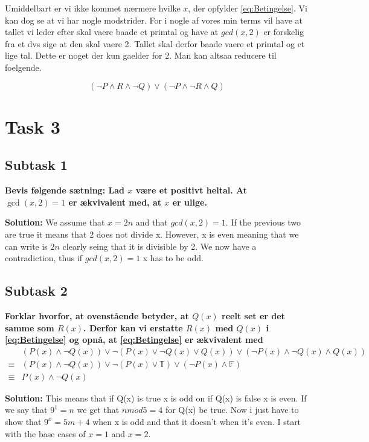 Umiddelbart er vi ikke kommet nærmere hvilke $x$, der opfylder \eqref{eq:Betingelse}. Vi kan dog se at vi har nogle modstrider. For i nogle af vores min terms vil have at tallet vi leder efter skal vaere baade et primtal og have at $gcd(x,2)$ er forskelig fra et dvs sige at den skal vaere 2. Tallet skal derfor baade vaere et primtal og et lige tal. Dette er noget der kun gaelder for 2. Man kan altsaa reducere til foelgende. 

\begin{equation}
    (\neg P \wedge R \wedge \neg Q)\vee(\neg P \wedge \neg R \wedge Q)
\end{equation}


\section{Task 3}
\subsection{Subtask 1}
\noindent
\textbf{Bevis følgende sætning: Lad $x$ være et positivt heltal. At $\gcd(x,2)=1$ er ækvivalent med, at $x$ er ulige.}

\bigskip
\noindent
\textbf{Solution:} We assume that $x=2n$ and that $gcd(x,2)=1$. If the previous two are true it means that 2 does not divide x. However, x is even meaning that we can write is $2n$ clearly seing that it is divisible by 2. We now have a contradiction, thus if $gcd(x,2)=1$ x has to be odd.

\subsection{Subtask 2}
\noindent
\textbf{Forklar hvorfor, at ovenstående betyder, at $Q(x)$ reelt set er det samme som $R(x)$. Derfor kan vi erstatte $R(x)$ med $Q(x)$ i \eqref{eq:Betingelse} og opnå, at \eqref{eq:Betingelse} er ækvivalent med
	\begin{align}\label{eq:BetingelseReduceret}
		&(P(x)\wedge \neg Q(x)) \vee \neg(P(x)\vee \neg Q(x) \vee Q(x)) \vee (\neg P(x) \wedge \neg Q(x) \wedge Q(x)) \nonumber\\ 
		\equiv& (P(x)\wedge \neg Q(x)) \vee \neg(P(x)\vee \mathbb{T}) \vee (\neg P(x) \wedge \mathbb{F}) \nonumber\\
		\equiv& P(x)\wedge \neg Q(x)
	\end{align}
}

\bigskip
\noindent
\textbf{Solution:} This means that if Q(x) is true x is odd on if Q(x) is false x is even. If we say that $9^1=n$ we get that $n mod 5 = 4$ for Q(x) be true. Now i just have to show that $9^x = 5m+4$ when x is odd and that it doesn't when it's even. I start with the base cases of $x=1$ and $x=2$.

